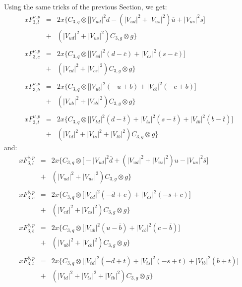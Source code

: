 \documentclass[10pt,a4paper]{article}
\begin{document}
Using the same tricks of the previous Section, we get:
\begin{equation}
\begin{array}{rcl}  
xF_{3,l}^{\nu,p} &=& 2x\Big\{C_{3,q}\otimes\Big[|V_{ud}|^2 d -\left(|V_{ud}|^2+|V_{us}|^2\right)\overline{u} + |V_{us}|^2 s\Big]\\
                 &+& \left(|V_{ud}|^2+|V_{us}|^2\right)C_{3,g}\otimes g\Big\}\\
\\
xF_{3,c}^{\nu,p} &=& 2x\Big\{C_{3,q}\otimes\Big[|V_{cd}|^2(d-\overline{c}) + |V_{cs}|^2 (s-\overline{c})\Big]\\
                 &+& \left(|V_{cd}|^2+|V_{cs}|^2\right)C_{3,g}\otimes g\Big\}\\
\\
xF_{3,b}^{\nu,p} &=& 2x\Big\{C_{3,q}\otimes\Big[|V_{ub}|^2(-\overline{u}+b) + |V_{cb}|^2 (-\overline{c}+b)\Big]\\
                 &+& \left(|V_{ub}|^2+|V_{cb}|^2\right)C_{3,g}\otimes g\Big\}\\
\\
xF_{3,t}^{\nu,p} &=& 2x\Big\{C_{3,q}\otimes\Big[|V_{td}|^2 (d -\overline{t})+ |V_{ts}|^2(s-\overline{t}) + |V_{tb}|^2(b-\overline{t})\Big]\\
                 &+& \left(|V_{td}|^2 + |V_{ts}|^2 + |V_{tb}|^2\right)C_{3,g}\otimes g\Big\}
\end{array}
\end{equation}
and:
\begin{equation}
\begin{array}{rcl}  
xF_{3,l}^{\overline\nu,p} &=& 2x\Big\{C_{3,q}\otimes\Big[-|V_{ud}|^2 \overline{d} +\left(|V_{ud}|^2+|V_{us}|^2\right)u - |V_{us}|^2 \overline{s}\Big]\\
                 &+& \left(|V_{ud}|^2+|V_{us}|^2\right)C_{3,g}\otimes g\Big\}\\
\\
xF_{3,c}^{\overline\nu,p} &=& 2x\Big\{C_{3,q}\otimes\Big[|V_{cd}|^2(-\overline{d}+c) + |V_{cs}|^2 (-\overline{s}+c)\Big]\\
                 &+& \left(|V_{cd}|^2+|V_{cs}|^2\right)C_{3,g}\otimes g\Big\}\\
\\
xF_{3,b}^{\overline\nu,p} &=& 2x\Big\{C_{3,q}\otimes\Big[|V_{ub}|^2(u-\overline{b}) + |V_{cb}|^2 (c-\overline{b})\Big]\\
                 &+& \left(|V_{ub}|^2+|V_{cb}|^2\right)C_{3,g}\otimes g\Big\}\\
\\
xF_{3,t}^{\overline\nu,p} &=& 2x\Big\{C_{3,q}\otimes\Big[|V_{td}|^2 (-\overline{d}+t)+ |V_{ts}|^2(-\overline{s}+t) + |V_{tb}|^2(\overline{b}+t)\Big]\\
                 &+& \left(|V_{td}|^2 + |V_{ts}|^2 + |V_{tb}|^2\right)C_{3,g}\otimes g\Big\}
\end{array}
\end{equation}
\end{document}
